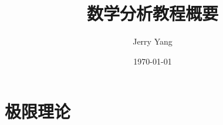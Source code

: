 \documentclass[UTF8, a4paper, oneside]{scrbook}
\title{数学分析教程概要}
\author{Jerry Yang}
\date{\today}
\begin{document}
\maketitle
\frontmatter
\tableofcontents
\mainmatter

\part{极限理论}



\backmatter
\end{document}
